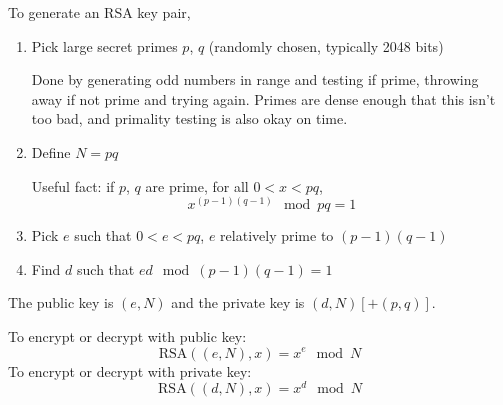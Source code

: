 To generate an RSA key pair,
\begin{enumerate}
    \item Pick large secret primes $p$, $q$ (randomly chosen, typically 2048
            bits)

        Done by generating odd numbers in range and testing if prime, throwing
        away if not prime and trying again. Primes are dense enough that this
        isn't too bad, and primality testing is also okay on time.
    \item Define $N = pq$

        Useful fact: if $p$, $q$ are prime, for all $0 < x < pq$,
        $$x^{(p-1)(q-1)} \mod{pq} = 1$$
    \item Pick $e$ such that $0 < e < pq$, $e$ relatively prime to $(p-1)(q-1)$
    \item Find $d$ such that $ed \mod{(p-1)(q-1)} = 1$
\end{enumerate}
The public key is $(e, N)$ and the private key is $(d, N) [+(p,q)]$.

To encrypt or decrypt with public key:
$$\text{RSA}((e,N), x) = x^e \mod N$$
To encrypt or decrypt with private key:
$$\text{RSA}((d,N), x) = x^d \mod N$$

